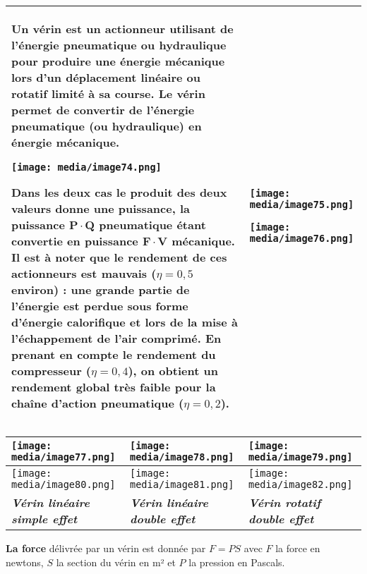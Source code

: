 \documentclass[
]{article}
\begin{document}
\begin{longtable}[]{@{}
  >{\raggedright\arraybackslash}p{}
  >{\raggedright\arraybackslash}p{}@{}}
\toprule
\endhead
Un vérin est un actionneur utilisant de l'énergie pneumatique ou
hydraulique pour produire une énergie mécanique lors d'un déplacement
linéaire ou rotatif limité à sa course. Le vérin permet de convertir de
l'énergie pneumatique (ou hydraulique) en énergie mécanique.

\texttt{[image: media/image74.png]}

Dans les deux cas le produit des deux valeurs donne une puissance, la
puissance \(\mathbf{P \cdot Q}\) pneumatique étant convertie en
puissance \(\mathbf{F \cdot V}\) mécanique. Il est à noter que le
rendement de ces actionneurs est mauvais (\(\eta = 0,5\) environ) : une
grande partie de l'énergie est perdue sous forme d'énergie calorifique
et lors de la mise à l'échappement de l'air comprimé. En prenant en
compte le rendement du compresseur (\(\eta = 0,4\)), on obtient un
rendement global très faible pour la chaîne d'action pneumatique
(\(\eta = 0,2\)). &
\texttt{[image: media/image75.png]}

\texttt{[image: media/image76.png]} \\
\bottomrule
\end{longtable}

\begin{longtable}[]{@{}lll@{}}
\toprule
\texttt{[image: media/image77.png]} &
\texttt{[image: media/image78.png]} &
\texttt{[image: media/image79.png]} \\
\midrule
\endhead
\texttt{[image: media/image80.png]} &
\texttt{[image: media/image81.png]} &
\texttt{[image: media/image82.png]} \\
\emph{\textbf{Vérin linéaire simple effet}} & \emph{\textbf{Vérin
linéaire double effet}} & \emph{\textbf{Vérin rotatif double effet}} \\
\bottomrule
\end{longtable}

\textbf{La force} délivrée par un vérin est donnée par \(F = PS\) avec
\(F\) la force en newtons, \(S\) la section du vérin en m² et \(P\) la
pression en Pascals.
\end{document}
